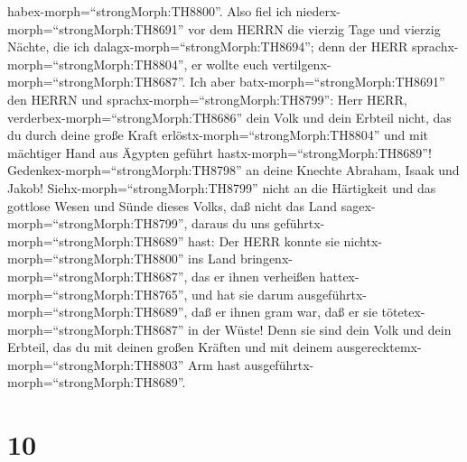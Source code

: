 habex-morph=``strongMorph:TH8800''.  Also fiel ich
niederx-morph=``strongMorph:TH8691'' vor dem HERRN die vierzig Tage und
vierzig Nächte, die ich dalagx-morph=``strongMorph:TH8694''; denn der
HERR sprachx-morph=``strongMorph:TH8804'', er wollte euch
vertilgenx-morph=``strongMorph:TH8687''.  Ich aber
batx-morph=``strongMorph:TH8691'' den HERRN und
sprachx-morph=``strongMorph:TH8799'': Herr HERR,
verderbex-morph=``strongMorph:TH8686'' dein Volk und dein Erbteil nicht,
das du durch deine große Kraft erlöstx-morph=``strongMorph:TH8804'' und
mit mächtiger Hand aus Ägypten geführt
hastx-morph=``strongMorph:TH8689''! 
Gedenkex-morph=``strongMorph:TH8798'' an deine Knechte Abraham, Isaak
und Jakob! Siehx-morph=``strongMorph:TH8799'' nicht an die Härtigkeit
und das gottlose Wesen und Sünde dieses Volks,  daß nicht
das Land sagex-morph=``strongMorph:TH8799'', daraus du uns
geführtx-morph=``strongMorph:TH8689'' hast: Der HERR konnte sie
nichtx-morph=``strongMorph:TH8800'' ins Land
bringenx-morph=``strongMorph:TH8687'', das er ihnen verheißen
hattex-morph=``strongMorph:TH8765'', und hat sie darum
ausgeführtx-morph=``strongMorph:TH8689'', daß er ihnen gram war, daß er
sie tötetex-morph=``strongMorph:TH8687'' in der Wüste! 
Denn sie sind dein Volk und dein Erbteil, das du mit deinen großen
Kräften und mit deinem ausgerecktemx-morph=``strongMorph:TH8803'' Arm
hast ausgeführtx-morph=``strongMorph:TH8689''.

\hypertarget{section-9}{%
\section{10}\label{section-9}}

